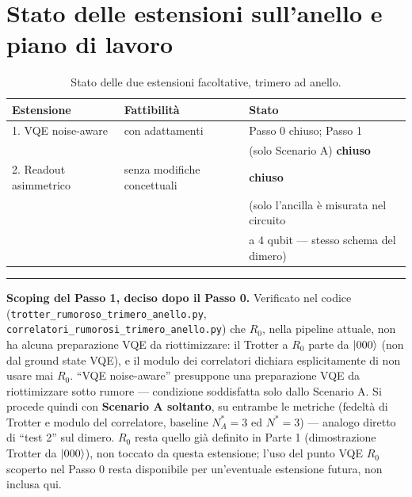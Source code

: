 \documentclass[11pt,a4paper]{article}
\begin{document}
\section{Stato delle estensioni sull'anello e piano di lavoro}

\begin{table}[htbp]
\centering
\caption{Stato delle due estensioni facoltative, trimero ad anello.}
\label{tab:anello-estensioni-stato}
\begin{tabular}{lll}
\toprule
Estensione & Fattibilità & Stato \\
\midrule
1. VQE noise-aware & con adattamenti & Passo 0 chiuso; Passo 1 \\
   & & (solo Scenario A) \textbf{chiuso} \\
2. Readout asimmetrico & senza modifiche concettuali & \textbf{chiuso} \\
   & & (solo l'ancilla è misurata nel circuito \\
   & & a 4 qubit --- stesso schema del dimero) \\
\bottomrule
\end{tabular}
\end{table}

\begin{center}
\begin{minipage}{0.93\textwidth}
\small\textcolor{rossos}{\rule{2.2em}{1.1pt}}\enspace
\textcolor{rossos}{\textbf{Scoping del Passo 1, deciso dopo il Passo 0.}}\enspace
Verificato nel codice (\texttt{trotter\_rumoroso\_trimero\_anello.py},
\texttt{correlatori\_rumorosi\_trimero\_anello.py}) che $R_0$, nella
pipeline attuale, non ha alcuna preparazione VQE da riottimizzare: il
Trotter a $R_0$ parte da $\lvert 000\rangle$ (non dal ground state VQE), e il
modulo dei correlatori dichiara esplicitamente di non usare mai $R_0$.
``VQE noise-aware'' presuppone una preparazione VQE da riottimizzare sotto
rumore --- condizione soddisfatta solo dallo Scenario A. Si procede quindi
con \textbf{Scenario A soltanto}, su entrambe le metriche (fedeltà di
Trotter e modulo del correlatore, baseline $N^*_A=3$ ed $N^*=3$) ---
analogo diretto di ``test 2'' sul dimero. $R_0$ resta quello già definito
in Parte 1 (dimostrazione Trotter da $\lvert 000\rangle$), non toccato da questa
estensione; l'uso del punto VQE $R_0$ scoperto nel Passo 0 resta
disponibile per un'eventuale estensione futura, non inclusa qui.
\end{minipage}
\end{center}
\medskip
\end{document}
